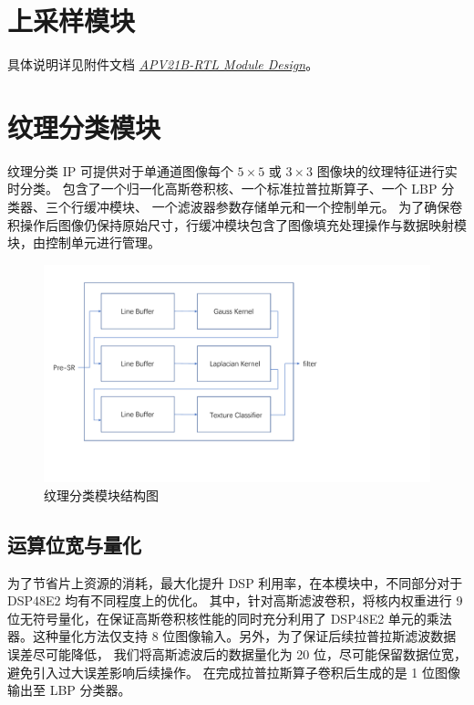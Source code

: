 \documentclass[12pt, a4paper, oneside]{ctexbook}
\begin{document}
	\chapter{上采样模块}
	具体说明详见附件文档 \href{./ref/APV21B_RTL_Module_Design.pdf}{\textit{APV21B-RTL Module Design}}。
	
	\chapter{纹理分类模块}
	纹理分类 IP 可提供对于单通道图像每个 $5\times5$ 或 $3\times3$ 图像块的纹理特征进行实时分类。
	包含了一个归一化高斯卷积核、一个标准拉普拉斯算子、一个 LBP 分类器、三个行缓冲模块、
	一个滤波器参数存储单元和一个控制单元。
	为了确保卷积操作后图像仍保持原始尺寸，行缓冲模块包含了图像填充处理操作与数据映射模块，由控制单元进行管理。

	\begin{figure}[h]
	\centering
	\includegraphics[scale=0.55]{./pic/texture}
	\caption{纹理分类模块结构图}
	\label{fig:texture}
	\end{figure}



	\section{运算位宽与量化}
	为了节省片上资源的消耗，最大化提升 DSP 利用率，在本模块中，不同部分对于 DSP48E2 均有不同程度上的优化。
	其中，针对高斯滤波卷积，将核内权重进行 9 位无符号量化，在保证高斯卷积核性能的同时充分利用了 DSP48E2 
	单元的乘法器。这种量化方法仅支持 8 位图像输入。另外，为了保证后续拉普拉斯滤波数据误差尽可能降低，
	我们将高斯滤波后的数据量化为 20 位，尽可能保留数据位宽，避免引入过大误差影响后续操作。
	在完成拉普拉斯算子卷积后生成的是 1 位图像输出至 LBP 分类器。
\end{document}
